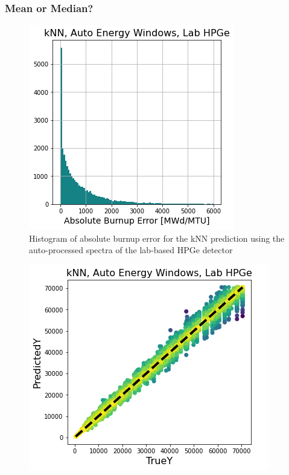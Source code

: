 \begin{frame}
  \frametitle{Mean or Median?}
  \begin{adjustwidth}{0pt}{-15pt}
  \begin{minipage}{0.49\textwidth}
    \begin{figure}
      \centering
      \includegraphics[width=\textwidth]{./figures/abs_err_hist.png}
      \caption{Histogram of absolute burnup error for the kNN prediction using the auto-processed spectra of the lab-based HPGe detector}
    \end{figure}
  \end{minipage}%
  \hfill
  \begin{minipage}{0.49\textwidth}
    \begin{figure}
      \centering
      \includegraphics[width=\textwidth]{./figures/true_v_pred.png}

\end{figure}
\end{minipage}
\end{adjustwidth}
\end{frame}

